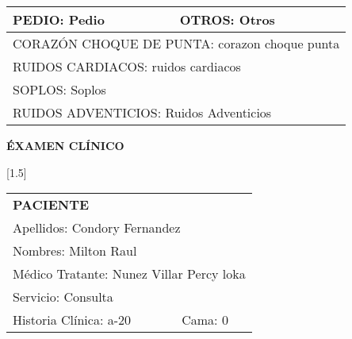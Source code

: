 \documentclass[10pt,a4paper]{article}
\begin{document}
{\begin{tabular}{|p{2.8cm}p{2.8cm}p{2.8cm}p{2.8cm}|}
\hline
\multicolumn{2}{|l}{\begin{minipage}[t]{5.5 cm}\scriptsize{PEDIO: Pedio}\end{minipage}}&\multicolumn{2}{l|}{\begin{minipage}[t]{5.5 cm}\scriptsize{OTROS: Otros}\end{minipage}}\\
\hline
\multicolumn{4}{|l|}{\begin{minipage}[t]{12.5 cm}\scriptsize{CORAZ\'ON CHOQUE DE PUNTA: corazon choque punta}\end{minipage}}\\
\hline
\multicolumn{4}{|l|}{\begin{minipage}[t]{12.5 cm}\scriptsize{RUIDOS CARDIACOS: ruidos cardiacos}\end{minipage}}\\
\hline
\multicolumn{4}{|l|}{\begin{minipage}[t]{12.5 cm}\scriptsize{SOPLOS: Soplos}\end{minipage}}\\
\hline
\multicolumn{4}{|l|}{\begin{minipage}[t]{12.5 cm}\scriptsize{RUIDOS ADVENTICIOS: Ruidos Adventicios}\end{minipage}}\\
\hline
\end{tabular}}
\vspace{0.6cm}
\begin{flushleft}
\begin{LARGE}
\textbf{\'EXAMEN CL\'INICO}
\end{LARGE}
\end{flushleft}
\newpage
\hfill
\begin{minipage}{10cm}
\begin{flushleft}
\scalebox{1.4}[1.5]{
\begin{tabular}{|p{3cm}p{2.3cm}|}
\hline 
\multicolumn{2}{|l|}{\scriptsize{\textbf{PACIENTE}}}\\
\multicolumn{2}{|p{5.3cm}|}{\scriptsize{Apellidos: Condory Fernandez}}\\ 
\multicolumn{2}{|p{5.3cm}|}{\scriptsize{Nombres: Milton Raul}}\\ 
\multicolumn{2}{|p{5.3cm}|}{\scriptsize{M\'edico Tratante: Nunez Villar Percy loka}}\\ 
\hline 
\multicolumn{2}{|p{5.3cm}|}{\scriptsize{Servicio: Consulta}}\\
\hline 
\scriptsize{Historia Cl\'inica: a-20}&\scriptsize{Cama: 0} \\ 
\hline 
\end{tabular}}
\end{flushleft}
\end{minipage}
\end{document}
